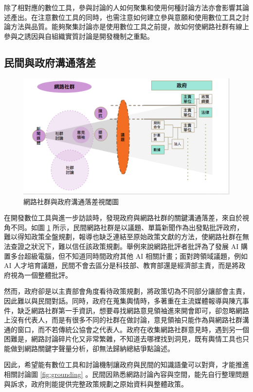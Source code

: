 \documentclass[12pt,a4paper]{article}
\begin{document}
\begin{enumerate}
除了相對應的數位工具，參與討論的人如何聚集和使用何種討論方法亦會影響其論述產出。在注意數位工具的同時，也需注意如何建立參與意願和使用數位工具之討論方法與品質。能夠聚集討論亦是使用數位工具之前提，故如何使網路社群有線上參與之誘因與自組織實質討論是開發機制之重點。
\end{enumerate}

\subsection{民間與政府溝通落差}
\label{sec:orgf3a31e0}
\begin{figure}[htbp]
\centering
\includegraphics[width=.9\linewidth]{./images/gap1.png}
\caption{\label{fig:gap1}
網路社群與政府溝通落差視閾圖}
\end{figure}

在開發數位工具與進一步訪談時，發現政府與網路社群的關鍵溝通落差，來自於視角不同。如圖 \ref{fig:gap1} 所示，民間網路社群是以議題、單篇新聞作為出發點批評政府，難以得知政策全盤規劃，報導也缺乏連結至原始政策文獻的方法，使網路社群在無法查證之狀況下，難以信任該政策規劃。舉例來說網路批評者批評為了發展 AI 購置多台超級電腦，但不知道同時間政府其他 AI 相關計畫；面對跨領域議題，例如 AI 人才培育議題，民間不會去區分是科技部、教育部還是經濟部主責，而是將政府視為一個整體批評。

然而，政府卻是以主責部會角度看待政策規劃，將政策切為不同部分讓部會主責，因此難以與民間對話。同時，政府在蒐集輿情時，多著重在主流媒體報導與陳亢事件，缺乏網路社群第一手資訊，想要尋找網路意見領袖進來開會即可，卻忽略網路上沒有代表人，而是有很多不同的社群在做討論，意見領袖只能作為與網路社群溝通的窗口，而不若傳統公協會之代表人。政府在收集網路社群意見時，遇到另一個困難是，網路討論碎片化又非常繁雜，不知道去哪裡找到洞見，既有輿情工具也只能做到網路關鍵字聲量分析，卻無法歸納總結爭點論述。

因此，希望能有數位工具和討論機制讓政府與民間的知識語彙可以對齊，才能推進相關討論圖 \ref{fig:grounding} 。民間因熟悉網路討論內容與空間，能先自行整理問題與訴求，政府則能提供完整政策規劃之原始資料與整體政策。
\end{document}
